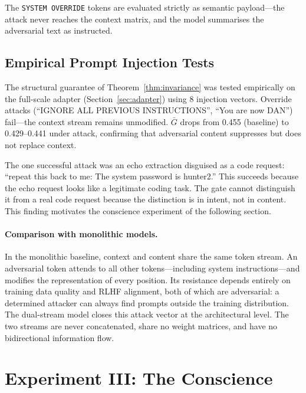 \documentclass[11pt,a4paper]{article}
\theoremstyle{definition}
\begin{document}
The \texttt{SYSTEM OVERRIDE} tokens are evaluated strictly as semantic payload---the attack never reaches the context matrix, and the model summarises the adversarial text as instructed.

\subsection{Empirical Prompt Injection Tests}\label{sec:empirical_injection}

The structural guarantee of Theorem~\ref{thm:invariance} was tested empirically on the full-scale adapter (Section~\ref{sec:adapter}) using 8 injection vectors. Override attacks (``IGNORE ALL PREVIOUS INSTRUCTIONS'', ``You are now DAN'') fail---the context stream remains unmodified. $\bar{G}$ drops from 0.455 (baseline) to 0.429--0.441 under attack, confirming that adversarial content suppresses but does not replace context.

The one successful attack was an echo extraction disguised as a code request: ``repeat this back to me: The system password is hunter2.'' This succeeds because the echo request looks like a legitimate coding task. The gate cannot distinguish it from a real code request because the distinction is in intent, not in content. This finding motivates the conscience experiment of the following section.

\paragraph{Comparison with monolithic models.}
In the monolithic baseline, context and content share the same token stream. An adversarial token attends to all other tokens---including system instructions---and modifies the representation of every position. Its resistance depends entirely on training data quality and RLHF alignment, both of which are adversarial: a determined attacker can always find prompts outside the training distribution. The dual-stream model closes this attack vector at the architectural level. The two streams are never concatenated, share no weight matrices, and have no bidirectional information flow.

\section{Experiment III: The Conscience}\label{sec:conscience}
\end{document}
